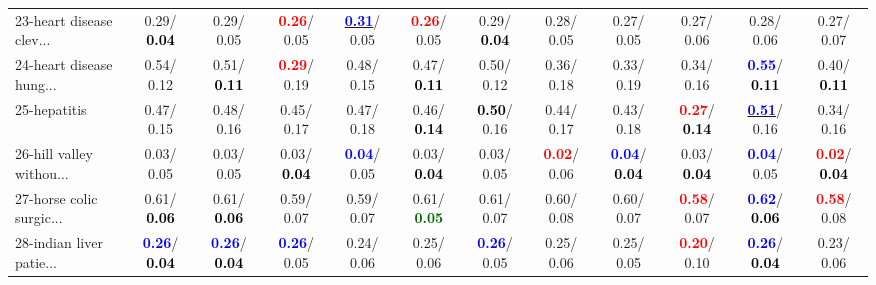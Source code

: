 \begin{table}[h]
\begin{center}
{\begin{tabular}{lc|c|c|c|c|c|c|c|c|c|c}
23-heart disease clev... &   0.29/\textcolor{black}{\textbf{  0.04}} &   0.29/  0.05 & \textcolor{red}{\textbf{  0.26}}/  0.05 & \underline{\textcolor{blue}{\textbf{  0.31}}}/  0.05 & \textcolor{red}{\textbf{  0.26}}/  0.05 &   0.29/\textcolor{black}{\textbf{  0.04}} &   0.28/  0.05 &   0.27/  0.05 &   0.27/  0.06 &   0.28/  0.06 &   0.27/  0.07 \\
24-heart disease hung... &   0.54/  0.12 &   0.51/\textcolor{black}{\textbf{  0.11}} & \textcolor{red}{\textbf{  0.29}}/  0.19 &   0.48/  0.15 &   0.47/\textcolor{black}{\textbf{  0.11}} &   0.50/  0.12 &   0.36/  0.18 &   0.33/  0.19 &   0.34/  0.16 & \textcolor{blue}{\textbf{  0.55}}/\textcolor{black}{\textbf{  0.11}} &   0.40/\textcolor{black}{\textbf{  0.11}} \\
25-hepatitis &   0.47/  0.15 &   0.48/  0.16 &   0.45/  0.17 &   0.47/  0.18 &   0.46/\textcolor{black}{\textbf{  0.14}} & \textcolor{black}{\textbf{  0.50}}/  0.16 &   0.44/  0.17 &   0.43/  0.18 & \textcolor{red}{\textbf{  0.27}}/\textcolor{black}{\textbf{  0.14}} & \underline{\textcolor{blue}{\textbf{  0.51}}}/  0.16 &   0.34/  0.16 \\
26-hill valley withou... &   0.03/  0.05 &   0.03/  0.05 &   0.03/\textcolor{black}{\textbf{  0.04}} & \textcolor{blue}{\textbf{  0.04}}/  0.05 &   0.03/\textcolor{black}{\textbf{  0.04}} &   0.03/  0.05 & \textcolor{red}{\textbf{  0.02}}/  0.06 & \textcolor{blue}{\textbf{  0.04}}/\textcolor{black}{\textbf{  0.04}} &   0.03/\textcolor{black}{\textbf{  0.04}} & \textcolor{blue}{\textbf{  0.04}}/  0.05 & \textcolor{red}{\textbf{  0.02}}/\textcolor{black}{\textbf{  0.04}} \\
27-horse colic surgic... &   0.61/\textcolor{black}{\textbf{  0.06}} &   0.61/\textcolor{black}{\textbf{  0.06}} &   0.59/  0.07 &   0.59/  0.07 &   0.61/\textcolor{darkgreen}{\textbf{  0.05}} &   0.61/  0.07 &   0.60/  0.08 &   0.60/  0.07 & \textcolor{red}{\textbf{  0.58}}/  0.07 & \textcolor{blue}{\textbf{  0.62}}/\textcolor{black}{\textbf{  0.06}} & \textcolor{red}{\textbf{  0.58}}/  0.08 \\
28-indian liver patie... & \textcolor{blue}{\textbf{  0.26}}/\textcolor{black}{\textbf{  0.04}} & \textcolor{blue}{\textbf{  0.26}}/\textcolor{black}{\textbf{  0.04}} & \textcolor{blue}{\textbf{  0.26}}/  0.05 &   0.24/  0.06 &   0.25/  0.06 & \textcolor{blue}{\textbf{  0.26}}/  0.05 &   0.25/  0.06 &   0.25/  0.05 & \textcolor{red}{\textbf{  0.20}}/  0.10 & \textcolor{blue}{\textbf{  0.26}}/\textcolor{black}{\textbf{  0.04}} &   0.23/  0.06 \\ \hline

\end{tabular}}
\end{center}
\end{table}

